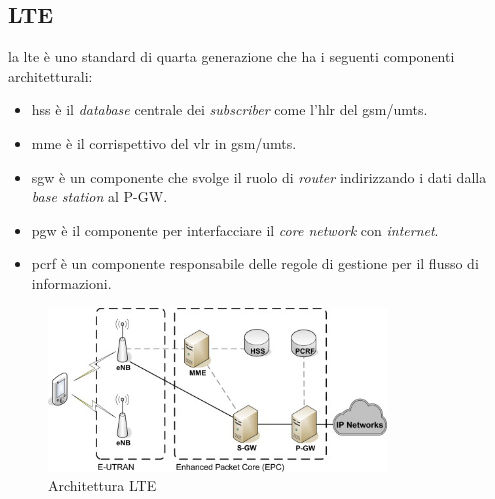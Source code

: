 \subsection{LTE}
la \gls{lte} è uno standard di quarta generazione che ha i seguenti componenti architetturali\cite{lte}:
\begin{itemize}
    \item \gls{hss} è il \textit{database} centrale dei \textit{subscriber} come l'\gls{hlr} del \gls{gsm}/\gls{umts}.
    \item \gls{mme} è il corrispettivo del \gls{vlr} in \gls{gsm}/\gls{umts}.
    \item \gls{sgw} è un componente che svolge il ruolo di \textit{router} indirizzando i dati dalla \textit{base station}
    al P-GW.
    \item \gls{pgw} è il componente per interfacciare il \textit{core network} con \textit{internet}.
    \item \gls{pcrf} è un componente responsabile delle regole di gestione per il flusso di informazioni.
\end{itemize}
\begin{figure}[ht]
    \centering
    \includegraphics[width=0.8\textwidth]{images/4g-lte.jpg}
    \caption{Architettura LTE}
\end{figure}

\clearpage

